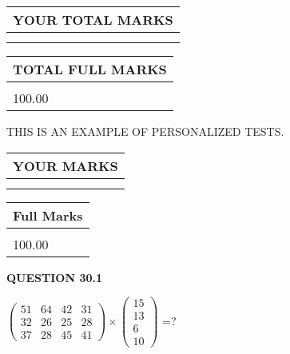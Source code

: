 \documentclass[12pt]{article}
\begin{document}
   
\vspace{0.2in}\noindent\begin{tabular}{|l|}
\hline
YOUR TOTAL MARKS  \\
\hline
 \\ 
 \\ 
\hline
\end{tabular}
\hspace{0.05in} \begin{tabular}{|l|}
\hline
TOTAL FULL MARKS  \\
\hline
 \\ 
100.00 \\
\hline
\end{tabular}
   
   
 \vspace{0.2in}
{\Huge  THIS IS AN EXAMPLE OF}
{\Huge  PERSONALIZED TESTS. }
   
   
  
\vspace{0.2in}
  
\noindent\begin{tabular}{|l|}
\hline
 YOUR MARKS  \\
\hline
 \\ 
 \\ 
\hline
\end{tabular}
\hspace{0.05in} \begin{tabular}{|l|}
\hline
 Full Marks  \\
\hline
 \\ 
100.00 \\
\hline
\end{tabular}
{\textbf{\Large{QUESTION
30.1 
}}}
  
  
 
$ \left( \begin{array}{ccccccccc}
 51  & 
 64  & 
 42  & 
 31  \\ 
 32  & 
 26  & 
 25  & 
 28  \\ 
 37  & 
 28  & 
 45  & 
 41
\end{array}\right) \times
\left( \begin{array}{c}
 15  \\ 
 13  \\ 
 6  \\ 
 10
\end{array}\right) $ =?
 
\end{document}
